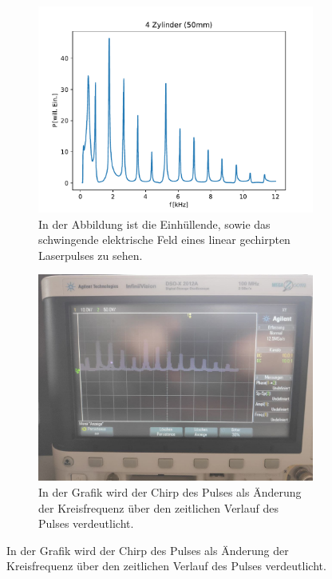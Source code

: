 \begin{figure}
            \centering
            \begin{subfigure}[b]{0.45\textwidth}
                \centering
                \includegraphics[scale=0.4]{./pictures/4_Zylinder_50mm.pdf}
                \caption{In der Abbildung ist die Einhüllende, sowie das schwingende elektrische Feld eines linear gechirpten Laserpulses zu sehen.}
            \end{subfigure}
            \hfill
            \centering
            \begin{subfigure}[b]{0.45\textwidth}
                \centering
                \includegraphics[scale=0.13]{./pictures/4_Zylinder.jpg}
                \caption{In der Grafik wird der Chirp des Pulses als Änderung der Kreisfrequenz über den zeitlichen Verlauf des Pulses verdeutlicht.}
            \end{subfigure}


\end{figure}
